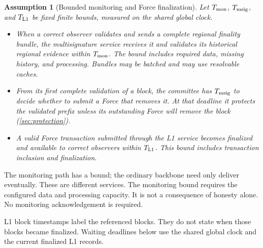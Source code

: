 \documentclass[11pt,a4paper]{article}
\newtheorem{assumption}[assumption]{Assumption}
\begin{document}
\begin{assumption}[Bounded monitoring and Force finalization]
\label{ass:monitor}
Let $T_{\rm mon}$, $T_{\rm msig}$, and $T_{\rm L1}$ be fixed finite
bounds, measured on the shared global clock.
\begin{itemize}
\item When a correct observer validates and sends a complete regional
finality bundle, the multisignature service receives it and validates its historical
regional evidence within $T_{\rm mon}$. The bound includes required data, missing history,
and processing. Bundles may be batched and may use resolvable caches.
\item From its first complete validation of a block, the committee has
$T_{\rm msig}$ to decide whether to submit a Force that removes it.
At that deadline it protects the validated prefix unless its outstanding
Force will remove the block (\cref{sec:protection}).
\item A valid Force transaction submitted through the L1 service becomes
finalized and available to correct observers within $T_{\rm L1}$.
This bound includes transaction inclusion and finalization.
\end{itemize}
\end{assumption}
The monitoring path has a bound; the ordinary backbone need only deliver
eventually. These are different services. The monitoring bound requires
the configured data and processing capacity. It is not a consequence of
honesty alone. No monitoring acknowledgement is required.

L1 block timestamps label the referenced blocks. They do not state when
those blocks became finalized. Waiting deadlines below use the shared
global clock and the current finalized L1 records.
\end{document}
